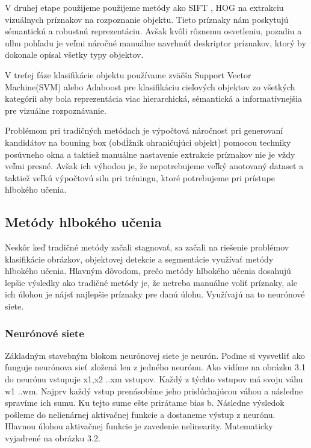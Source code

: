 V druhej etape použijeme použijeme metódy ako SIFT \cite{SIFT}, HOG \cite{HOG} na extrakciu vizuálnych príznakov na rozpoznanie objektu. Tieto príznaky nám poskytujú sémantickú a robustnú reprezentáciu. Avšak kvôli rôznemu osvetleniu, pozadiu a ulhu pohľadu je veľmi náročné manuálne navrhnúť deskriptor príznakov, ktorý by dokonale opísal všetky typy objektov. 

V treťej fáze klasifikácie objektu používame zväčša Support Vector Machine(SVM) \cite{SVM} alebo Adaboost \cite{Adaboost} pre klasifikáciu cieľových objektov zo všetkých kategórii aby bola reprezentácia viac hierarchická, sémantická a informatívnejšia pre vizuálne rozpoznávanie. 

Problémom pri tradičných metódach je výpočtová náročnosť pri generovaní kandidátov na bouning box (obdĺžnik ohraničujúci objekt) pomocou techniky posúvneho okna a taktiež manuálne nastavenie extrakcie príznakov nie je vždy veľmi presné. Avšak ich výhodou je, že nepotrebujeme veľký anotovaný dataset a taktiež veľkú výpočtovú silu pri tréningu, ktoré potrebujeme pri prístupe hlbokého učenia.

\subsection{Metódy hlbokého učenia}
\hspace{\parindent} Neskôr keď tradičné metódy začali stagnovať, sa začali na riešenie problémov klasifikácie obrázkov, objektovej detekcie a segmentácie využívať metódy hlbokého učenia. Hlavným dôvodom, prečo metódy hlbokého učenia dosahujú lepšie výsledky ako tradičné metódy je, že netreba manuálne voliť príznaky, ale ich úlohou je nájsť najlepšie príznaky pre danú úlohu. Využívajú na to neurónové siete. 

\subsubsection{Neurónové siete}
\hspace{\parindent} Základným stavebným blokom neurónovej siete je neurón. Poďme si vysvetliť ako funguje neurónova sieť zložená len z jedného neurónu. Ako vidíme na obrázku 3.1 do neurónu vstupuje x1,x2 ..xm vstupov. Každý z týchto vstupov má svoju váhu w1 ..wm. Najprv každý vstup prenásobíme jeho prislúchajúcou váhou a následne spravíme ich sumu. Ku tejto sume ešte prirátame bias b. Následne výsledok pošleme do nelienárnej aktivačnej funkcie a dostaneme výstup z neurónu. Hlavnou úlohou aktivačnej funkcie je zavedenie nelinearity. Matematicky vyjadrené na obrázku 3.2. 

